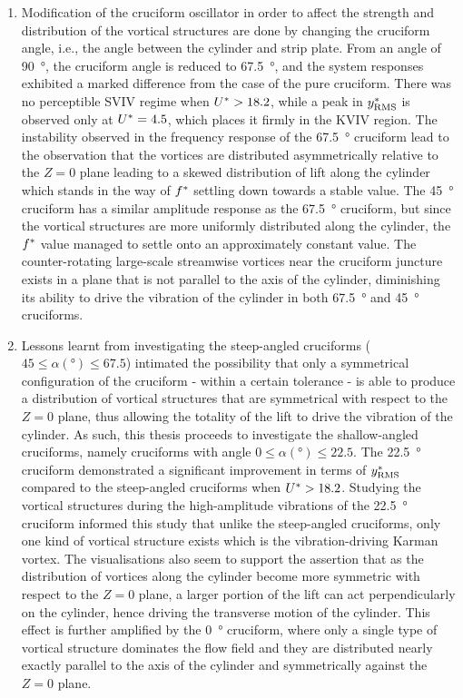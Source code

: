 \documentclass[oneside]{utmthesis}
\begin{document}
\begin{enumerate}
  \item Modification of the cruciform oscillator in order to affect the strength and distribution of the vortical structures are done by changing the cruciform angle, i.e., the angle between the cylinder and strip plate. From an angle of \SI{90}{\degree}, the cruciform angle is reduced to \SI{67.5}{\degree}, and the system responses exhibited a marked difference from the case of the pure cruciform. There was no perceptible SVIV regime when $U^{*} > 18.2$, while a peak in $y^{*}_{\text{RMS}}$ is observed only at $U^{*} = 4.5$, which places it firmly in the KVIV region. The instability observed in the frequency response of the \SI{67.5}{\degree} cruciform lead to the observation that the vortices are distributed asymmetrically relative to the $Z =0$ plane leading to a skewed distribution of lift along the cylinder which stands in the way of $f^{*}$ settling down towards a stable value. The \SI{45}{\degree} cruciform has a similar amplitude response as the \SI{67.5}{\degree} cruciform, but since the vortical structures are more uniformly distributed along the cylinder, the $f^{*}$ value managed to settle onto an approximately constant value. The counter-rotating large-scale streamwise vortices near the cruciform juncture exists in a plane that is not parallel to the axis of the cylinder, diminishing its ability to drive the vibration of the cylinder in both \SI{67.5}{\degree} and \SI{45}{\degree} cruciforms.
  \item Lessons learnt from investigating the steep-angled cruciforms ($45 \leq \alpha (\si{\degree}) \leq 67.5$) intimated the possibility that only a symmetrical configuration of the cruciform - within a certain tolerance - is able to produce a distribution of vortical structures that are symmetrical with respect to the $Z = 0$ plane, thus allowing the totality of the lift to drive the vibration of the cylinder. As such, this thesis proceeds to investigate the shallow-angled cruciforms, namely cruciforms with angle $0 \leq \alpha (\si{\degree}) \leq 22.5$. The \SI{22.5}{\degree} cruciform demonstrated a significant improvement in terms of $y^{*}_{\text{RMS}}$ compared to the steep-angled cruciforms when $U^{*} > 18.2$. Studying the vortical structures during the high-amplitude vibrations of the \SI{22.5}{\degree} cruciform informed this study that unlike the steep-angled cruciforms, only one kind of vortical structure exists which is the vibration-driving Karman vortex. The visualisations also seem to support the assertion that as the distribution of vortices along the cylinder become more symmetric with respect to the $Z = 0$ plane, a larger portion of the lift can act perpendicularly on the cylinder, hence driving the transverse motion of the cylinder. This effect is further amplified by the \SI{0}{\degree} cruciform, where only a single type of vortical structure dominates the flow field and they are distributed nearly exactly parallel to the axis of the cylinder and symmetrically against the $Z=0$ plane.

\end{enumerate}
\end{document}
